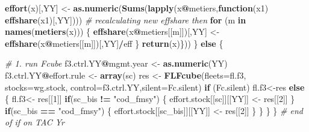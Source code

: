 \documentclass[
]{article}
\newenvironment{Shaded}{\begin{snugshade}}{\end{snugshade}}
\newcommand{\CommentTok}[1]{\textcolor[rgb]{0.56,0.35,0.01}{\textit{#1}}}
\newcommand{\ControlFlowTok}[1]{\textcolor[rgb]{0.13,0.29,0.53}{\textbf{#1}}}
\newcommand{\DataTypeTok}[1]{\textcolor[rgb]{0.13,0.29,0.53}{#1}}
\newcommand{\DecValTok}[1]{\textcolor[rgb]{0.00,0.00,0.81}{#1}}
\newcommand{\KeywordTok}[1]{\textcolor[rgb]{0.13,0.29,0.53}{\textbf{#1}}}
\newcommand{\NormalTok}[1]{#1}
\newcommand{\OperatorTok}[1]{\textcolor[rgb]{0.81,0.36,0.00}{\textbf{#1}}}
\newcommand{\StringTok}[1]{\textcolor[rgb]{0.31,0.60,0.02}{#1}}
\begin{document}
\begin{Shaded}
\begin{Highlighting}[]
{                                                \KeywordTok{effort}\NormalTok{(x)[,YY] <-}\StringTok{ }\KeywordTok{as.numeric}\NormalTok{(}\KeywordTok{Sums}\NormalTok{(}\KeywordTok{lapply}\NormalTok{(x}\OperatorTok{@}\NormalTok{metiers,}\ControlFlowTok{function}\NormalTok{(x1) }\KeywordTok{effshare}\NormalTok{(x1)[,YY])))}
                                                \CommentTok{# recalculating new effshare then}
                                                \ControlFlowTok{for}\NormalTok{ (m }\ControlFlowTok{in} \KeywordTok{names}\NormalTok{(}\KeywordTok{metiers}\NormalTok{(x))) \{}
                                                    \KeywordTok{effshare}\NormalTok{(x}\OperatorTok{@}\NormalTok{metiers[[m]])[,YY] <-}\StringTok{ }\KeywordTok{effshare}\NormalTok{(x}\OperatorTok{@}\NormalTok{metiers[[m]])[,YY]}\OperatorTok{/}\NormalTok{eff}
\NormalTok{                                                \}}
                                      \KeywordTok{return}\NormalTok{(x)\}))}
\NormalTok{                       \} }\ControlFlowTok{else}\NormalTok{ \{}

                          \CommentTok{# 1. run Fcube}
\NormalTok{                          f3.ctrl.YY}\OperatorTok{@}\NormalTok{mgmt.year <-}\StringTok{ }\KeywordTok{as.numeric}\NormalTok{(YY)}
\NormalTok{                          f3.ctrl.YY}\OperatorTok{@}\NormalTok{effort.rule <-}\StringTok{ }\KeywordTok{array}\NormalTok{(sc)}
\NormalTok{                          res <-}\StringTok{ }\KeywordTok{FLFcube}\NormalTok{(}\DataTypeTok{fleets=}\NormalTok{fl.f3, }\DataTypeTok{stocks=}\NormalTok{wg.stock, }\DataTypeTok{control=}\NormalTok{f3.ctrl.YY,}\DataTypeTok{silent=}\NormalTok{Fc.silent)}
                          \ControlFlowTok{if}\NormalTok{ (Fc.silent) fl.f3<-res }\ControlFlowTok{else}\NormalTok{ \{}
\NormalTok{                            fl.f3<-}\StringTok{ }\NormalTok{res[[}\DecValTok{1}\NormalTok{]]}
                                  \ControlFlowTok{if}\NormalTok{(sc_bis }\OperatorTok{!=}\StringTok{ "cod_fmsy"}\NormalTok{) \{}
\NormalTok{                                  effort.stock[[sc]][[YY]] <-}\StringTok{ }\NormalTok{res[[}\DecValTok{2}\NormalTok{]]}
\NormalTok{                                  \}}
                                  \ControlFlowTok{if}\NormalTok{(sc_bis }\OperatorTok{==}\StringTok{ "cod_fmsy"}\NormalTok{) \{}
\NormalTok{                                  effort.stock[[sc_bis]][[YY]] <-}\StringTok{ }\NormalTok{res[[}\DecValTok{2}\NormalTok{]]}
\NormalTok{                                  \}}
\NormalTok{                            \}}
\NormalTok{                      \}}
\NormalTok{            \} }\CommentTok{# end of if on TAC Yr}
    
}
\end{Highlighting}
\end{Shaded}
\end{document}
